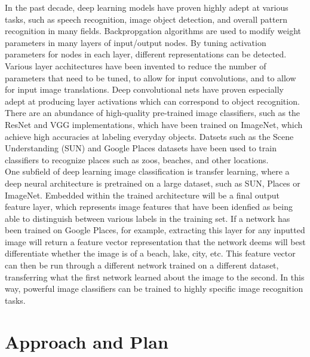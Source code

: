 \documentclass[11pt]{article}
\begin{document}
In the past decade, deep learning models have proven highly adept at various tasks, such as speech recognition, image object detection, and overall pattern recognition in many fields. Backpropgation algorithms are used to modify weight parameters in many layers of input/output nodes. By tuning activation parameters for nodes in each layer, different representations can be detected. Various layer acchitectures have been invented to reduce the number of parameters that need to be tuned, to allow for input convolutions, and to allow for input image translations. Deep convolutional nets have proven especially adept at producing layer activations which can correspond to object recognition.\cite{lecun2015deep}\\

There are an abundance of high-quality pre-trained image classifiers, such as the ResNet and VGG implementations, which have been trained on ImageNet, which achieve high accuracies at labeling everyday objects.\cite{simonyan2014very}\cite{he2015deep}\cite{deng2009imagenet} Datsets such as the Scene Understanding (SUN) and Google Places datasets have been used to train classifiers to recognize places such as zoos, beaches, and other locations.\cite{xiao2010sun}\cite{zhou2014learning}\\

One subfield of deep learning image classification is transfer learning, where a deep neural architecture is pretrained on a large dataset, such as SUN, Places or ImageNet. Embedded within the trained architecture will be a final output feature layer, which represents image features that have been idenfied as being able to distinguish between various labels in the training set. If a network has been trained on Google Places, for example, extracting this layer for any inputted image will return a feature vector representation that the network deems will best differentiate whether the image is of a beach, lake, city, etc. This feature vector can then be run through a different network trained on a different dataset, transferring what the first network learned about the image to the second. In this way, powerful image classifiers can be trained to highly specific image recognition tasks.\cite{bengio2012deep}


\section{Approach and Plan}
\end{document}
